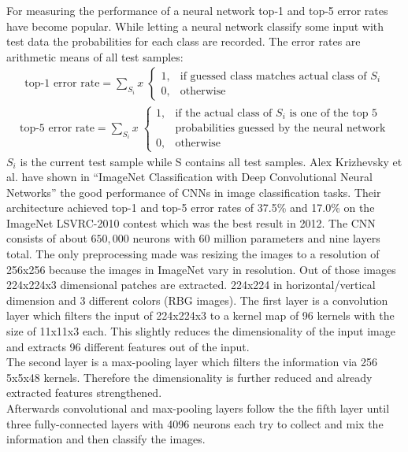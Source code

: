 \documentclass[12pt,twoside]{article}
\theoremstyle{plain}
\theoremstyle{definition}
\theoremstyle{remark}
\begin{document}
For measuring the performance of a neural network top-1 and top-5 error rates have become popular. While letting a neural network classify some input with test data the probabilities for each class are recorded. The error rates are arithmetic means of all test samples:
\begin{gather}
	\label{equation:top-1-error-rate}
	\text{top-1 error rate} = \sum_{S_i} x \;
	\begin{cases}
		1, & \text{if guessed class matches actual class of $S_i$} \\
		0, & \text{otherwise}
	\end{cases}
\end{gather}
\begin{gather}
	\label{equation:top-5-error-rate}
	\text{top-5 error rate} = \sum_{S_i} x \;
	\begin{cases}
	1, & \text{if the actual class of $S_i$ is one of the top 5} \\
	   & \text{probabilities guessed by the neural network} \\
	0, & \text{otherwise}
	\end{cases}
\end{gather}
$S_i$ is the current test sample while S contains all test samples.
Alex Krizhevsky et al. have shown in \enquote{ImageNet Classification with Deep Convolutional Neural Networks} \cite{ImangeNetClassificationCNN-Krizhevsky} the good performance of CNNs in image classification tasks. Their architecture achieved top-1 and top-5 error rates of 37.5\% and 17.0\% on the ImageNet LSVRC-2010 contest which was the best result in 2012.
The CNN consists of about $650,000$ neurons with $60$ million parameters and nine layers total.
The only preprocessing made was resizing the images to a resolution of 256x256 because the images in ImageNet vary in resolution. Out of those images 224x224x3 dimensional patches are extracted. 224x224 in horizontal/vertical dimension and 3 different colors (RBG images). The first layer is a convolution layer which filters the input of 224x224x3 to a kernel map of 96 kernels with the size of 11x11x3 each. This slightly reduces the dimensionality of the input image and extracts 96 different features out of the input.
\\
The second layer is a max-pooling layer which filters the information via 256 5x5x48 kernels. Therefore the dimensionality is further reduced and already extracted features strengthened.
\\
Afterwards convolutional and max-pooling layers follow the the fifth layer until three fully-connected layers with 4096 neurons each try to collect and mix the information and then classify the images.
\end{document}
